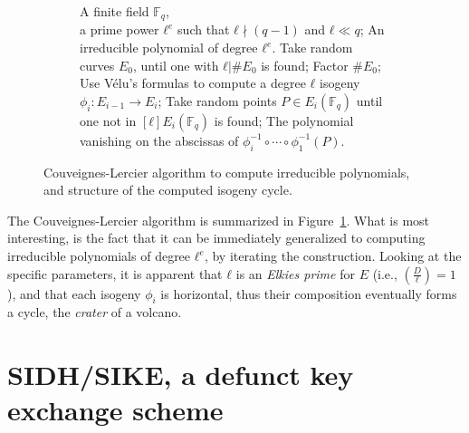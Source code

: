 \documentclass[10pt]{article}
\theoremstyle{plain}
\theoremstyle{definition}
\def\F{\ensuremath{\mathbb{F}}}
\begin{document}
\begin{figure}
  \begin{subfigure}{0.65\textwidth}
    \begin{algorithmic}[1]
      \REQUIRE A finite field $\F_q$,\\
      a prime power $ℓ^e$ such that $ℓ\nmid(q-1)$ and $ℓ\ll q$;
      \ENSURE An irreducible polynomial of degree $ℓ^e$.
      \STATE Take random curves $E_0$, until one with $ℓ|\#E_0$ is found;
      \STATE Factor $\#E_0$;
      \STATE Use V\'elu's formulas to compute a degree $ℓ$ isogeny $ϕ_i:E_{i-1}\to E_i$;
      \ENDFOR
      \STATE Take random points $P\in E_i(\F_q)$ until one not in $[ℓ]E_i(\F_q)$ is found;
      \RETURN The polynomial vanishing on the abscissas of $ϕ_i^{-1}∘\cdots∘ϕ_1^{-1}(P)$.
    \end{algorithmic}
  \end{subfigure}
  \hfill
  \begin{subfigure}{0.2\textwidth}
  \end{subfigure}
  
  \caption{Couveignes-Lercier algorithm to compute irreducible
    polynomials, and structure of the computed isogeny cycle.}
  \label{fig:CL}
\end{figure}

The Couveignes-Lercier algorithm is summarized in
Figure~\ref{fig:CL}. %
What is most interesting, is the fact that it can be immediately
generalized to computing irreducible polynomials of degree $ℓ^e$, by
iterating the construction. %
Looking at the specific parameters, it is apparent that $ℓ$ is an
\emph{Elkies prime} for $E$ (i.e., $\left(\frac{D}{ℓ}\right)=1$), and
that each isogeny $ϕ_i$ is horizontal, thus their composition
eventually forms a cycle, the \emph{crater} of a volcano.


\section{SIDH/SIKE, a defunct key exchange scheme}
\label{sec:sidh}
\end{document}
